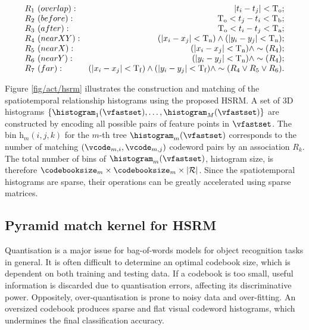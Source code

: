 \begin{equation}
	\centering 
	\begin{array}{lr}
		R_{1}~{(overlap)}: & |t_i - t_j| < \mathrm{T_{o}}; \\
		R_{2}~{(before)}: & \mathrm{T_{o}} < t_j - t_i < \mathrm{T_{b}}; \\
		R_{3}~{(after)}: & \mathrm{T_{o}} < t_i - t_j < \mathrm{T_{a}}; \\
		R_{4}~{(near XY)}: & (|x_i - x_j| < \mathrm{T_{n}}) \wedge (|y_i - y_j| < \mathrm{T_{n}}); \\
		R_{5}~{(near X)}: & (|x_i - x_j| < \mathrm{T_{n}}) \wedge \sim(R_{4}); \\
		R_{6}~{(near Y)}: & (|y_i - y_j| < \mathrm{T_{n}}) \wedge \sim(R_{4}); \\
		R_{7}~{(far)}: & (|x_i - x_j| < \mathrm{T_{f}}) \wedge (|y_i - y_j| < \mathrm{T_{f}}) \wedge \sim(R_{4} \vee R_{5} \vee R_{6}).
	\end{array}
\end{equation}

Figure \ref{fig/act/hsrm} illustrates the construction and matching of the spatiotemporal relationship histograms using the proposed HSRM. 
A set of 3D histograms $\{ \histogram_1(\vfastset),\dots,\histogram_{M}(\vfastset)\}$ are constructed by encoding all possible pairs of feature points in $\vfastset$. The bin $\mathrm{h}_{m}(i,j,k)$ for the $m$-th tree $\histogram_{m}(\vfastset)$ corresponds to the number of matching $(\vcode_{m,i},\vcode_{m,j})$ codeword pairs by an association $R_k$. The total number of bins of $\histogram_m(\vfastset)$, \ie histogram size, is therefore $\codebooksize_m \times \codebooksize_m \times |\mathcal{R}|$. Since the spatiotemporal histograms are sparse, their operations can be greatly accelerated using sparse matrices.  

\subsection{Pyramid match kernel for HSRM}
Quantisation is a major issue for bag-of-words models for object recognition tasks in general. It is often difficult to determine an optimal codebook size, which is dependent on both training and testing data. 
If a codebook is too small, useful information is discarded due to quantisation errors, affecting its discriminative power. 
Oppositely, over-quantisation is prone to noisy data and over-fitting. An oversized codebook produces sparse and flat visual codeword histograms, which undermines the final classification accuracy.  

